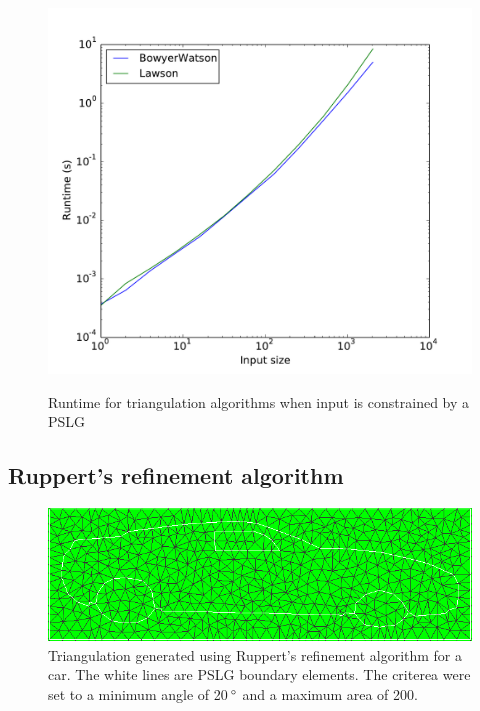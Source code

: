 \begin{figure}
    \includegraphics[width=\columnwidth]{../images/runtime_segments.pdf}
    \label{fig:triangulation-pslg-runtime}
    \caption{Runtime for triangulation algorithms when input is constrained by a PSLG}
\end{figure}

\subsection{Ruppert's refinement algorithm}

\begin{figure}
    \centering
    \includegraphics[width=\columnwidth]{../images/Car_Ruppert20.png}
    \caption{Triangulation generated using Ruppert's refinement algorithm for a car. The white lines are PSLG boundary elements.
    The criterea were set to a minimum angle of 20$\,^{\circ}$ and a maximum area of 200.}
    \label{fig:result_Car20}
\end{figure}

